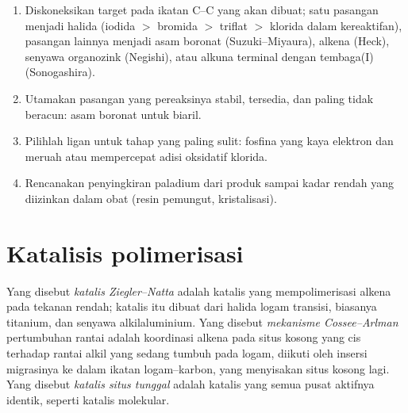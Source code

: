 \begin{method}\label{met:b3:homogeneous-catalysis:choose-coupling}
\begin{enumerate}
  \item Diskoneksikan target pada ikatan C--C yang akan dibuat; satu pasangan menjadi
        halida (iodida $>$ bromida $>$ triflat $>$ klorida dalam kereaktifan), pasangan lainnya menjadi
        asam boronat (Suzuki--Miyaura), alkena (Heck), senyawa organozink
        (Negishi), atau alkuna terminal dengan tembaga(I) (Sonogashira).
  \item Utamakan pasangan yang pereaksinya stabil, tersedia, dan paling tidak
        beracun: asam boronat untuk biaril.
  \item Pilihlah ligan untuk tahap yang paling sulit: fosfina yang kaya elektron dan meruah
        atau  mempercepat adisi oksidatif klorida.
  \item Rencanakan penyingkiran paladium dari produk sampai kadar rendah yang
        diizinkan dalam obat (resin pemungut, kristalisasi).
\end{enumerate}
\end{method}

\section{Katalisis polimerisasi}

\begin{definition}\label{def:b3:homogeneous-catalysis:ziegler-natta}
Yang disebut \emph{katalis Ziegler--Natta} adalah katalis yang mempolimerisasi
alkena pada tekanan rendah; katalis itu dibuat dari halida logam transisi, biasanya
titanium, dan senyawa alkilaluminium. Yang disebut \emph{mekanisme
Cossee--Arlman} pertumbuhan rantai adalah koordinasi
alkena pada situs kosong yang cis terhadap rantai alkil yang sedang tumbuh pada logam,
diikuti oleh insersi migrasinya ke dalam ikatan logam--karbon, yang menyisakan
situs kosong lagi. Yang disebut \emph{katalis situs tunggal} adalah katalis yang
semua pusat aktifnya identik, seperti katalis  molekular.
\end{definition}

